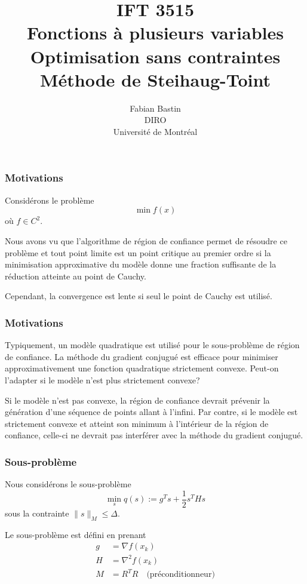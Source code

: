 \documentclass[usepdftitle=false]{beamer}
\title[IFT3515]{IFT 3515\\Fonctions à plusieurs variables\\Optimisation sans contraintes\\Méthode de Steihaug-Toint}
\author[Fabian Bastin]{Fabian Bastin\\DIRO\\Université de Montréal}
\date{}
\begin{document}
\frame{\titlepage}


\begin{frame}
\frametitle{Motivations}

Considérons le problème
$$
\min f(x)
$$
où $f \in C^2$.

\mbox{}

Nous avons vu que l'algorithme de région de confiance permet de résoudre ce problème et tout point limite est un point critique au premier ordre si la minimisation approximative du modèle donne une fraction suffisante de la réduction atteinte au point de Cauchy.

\mbox{}

Cependant, la convergence est lente si seul le point de Cauchy est utilisé.

\end{frame}

\begin{frame}
\frametitle{Motivations}

Typiquement, un modèle quadratique est utilisé pour le sous-problème de région de confiance.
La méthode du gradient conjugué est efficace pour minimiser approximativement une fonction quadratique strictement convexe. Peut-on l'adapter si le modèle n'est plus strictement convexe?

\mbox{}

Si le modèle n'est pas convexe, la région de confiance devrait prévenir la génération d'une séquence de points allant à l'infini.
Par contre, si le modèle est strictement convexe et atteint son minimum à l'intérieur de la région de confiance, celle-ci ne devrait pas interférer avec la méthode du gradient conjugué.

\end{frame}

\begin{frame}
\frametitle{Sous-problème}

Nous considérons le sous-problème
$$
\min_s q(s) := g^Ts + \frac{1}{2} s^T H s
$$
sous la contrainte $\| s \|_M \leq \Delta$.

\mbox{}

Le sous-problème est défini en prenant
\begin{align*}
g &= \nabla f(x_k) \\
H &= \nabla^2 f(x_k) \\
M &= R^TR \quad \mbox{(préconditionneur)}
\end{align*}

\end{frame}
\end{document}
